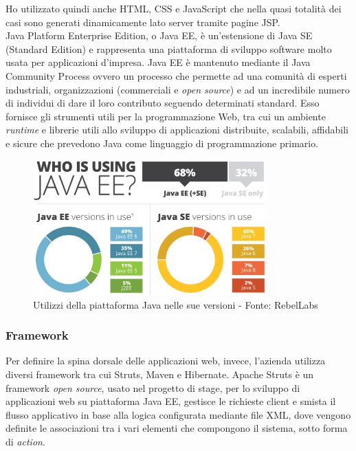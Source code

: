 	Ho utilizzato quindi anche HTML, CSS e JavaScript che nella quasi totalità dei casi sono generati dinamicamente lato server tramite pagine JSP.\\
		
	Java Platform Enterprise Edition, o Java EE, è un'estensione di Java SE (Standard Edition) e rappresenta una piattaforma di sviluppo software molto usata per applicazioni d'impresa. Java EE è mantenuto mediante il Java Community Process ovvero un processo che permette ad una comunità di esperti industriali,	organizzazioni (commerciali e \textit{open source}) e ad un incredibile numero di individui di dare il loro contributo seguendo determinati standard. Esso fornisce gli strumenti utili per la programmazione Web, tra cui un ambiente \textit{runtime} e librerie utili allo sviluppo di applicazioni distribuite, scalabili, affidabili e sicure che prevedono Java come linguaggio di programmazione primario.
	
	\begin{figure}[H]
		\centering
	   	\includegraphics[width=0.8\textwidth]{immagini/utilizzi_java}
	   	\caption{Utilizzi della piattaforma Java nelle sue versioni - Fonte: RebelLabs}
	\end{figure}	
	
	\subsubsection{Framework}
	Per definire la spina dorsale delle applicazioni web, invece, l'azienda utilizza diversi framework tra cui Struts, Maven e Hibernate. Apache Struts è un framework \textit{open source}, usato nel progetto di stage, per lo sviluppo di applicazioni web su piattaforma Java EE, gestisce le richieste client e smista il flusso applicativo in base alla logica configurata mediante file XML, dove vengono definite le associazioni tra i vari elementi che compongono il sistema, sotto forma di \textit{action}.\\
	
